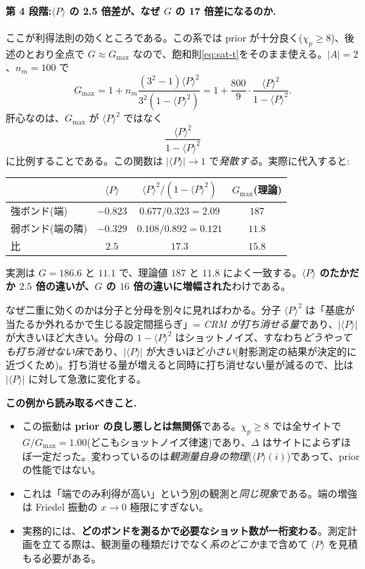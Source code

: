 \documentclass[11pt,a4paper]{ltjsarticle}
\newcommand{\ev}[1]{\langle #1\rangle}
\begin{document}
\paragraph{第 4 段階:$\ev{P}$ の 2.5 倍差が、なぜ $G$ の 17 倍差になるのか.}
ここが利得法則の効くところである。この系では prior が十分良く($\chi_p\ge8$)、後述のとおり全点で $G\approx G_{\max}$ なので、飽和則\eqref{eq:sat-t}をそのまま使える。$|A|=2$、$n_m=100$ で
\begin{equation}
  G_{\max}=1+n_m\frac{(3^2-1)\ev{P}^2}{3^2(1-\ev{P}^2)}
        =1+\frac{800}{9}\cdot\frac{\ev{P}^2}{1-\ev{P}^2}.
\end{equation}
肝心なのは、$G_{\max}$ が $\ev{P}^2$ ではなく
\begin{equation}
  \frac{\ev{P}^2}{1-\ev{P}^2}
\end{equation}
に比例することである。この関数は $|\ev{P}|\to1$ で\emph{発散する}。実際に代入すると:
\begin{center}\small
\begin{tabular}{lccc}
\hline
 & $\ev{P}$ & $\ev{P}^2/(1-\ev{P}^2)$ & $G_{\max}$(理論)\\
\hline
強ボンド(端)& $-0.823$ & $0.677/0.323=2.09$ & $187$\\
弱ボンド(端の隣)& $-0.329$ & $0.108/0.892=0.121$ & $11.8$\\
\hline
比 & $2.5$ & $\mathbf{17.3}$ & $\mathbf{15.8}$\\
\hline
\end{tabular}
\end{center}
実測は $G=186.6$ と $11.1$ で、理論値 $187$ と $11.8$ によく一致する。\textbf{$\ev{P}$ のたかだか $2.5$ 倍の違いが、$G$ の $16$ 倍の違いに増幅された}わけである。

なぜ二重に効くのかは分子と分母を別々に見ればわかる。分子 $\ev{P}^2$ は「基底が当たるか外れるかで生じる設定間揺らぎ」= \emph{CRM が打ち消せる量}であり、$|\ev{P}|$ が大きいほど大きい。分母の $1-\ev{P}^2$ はショットノイズ、すなわち\emph{どうやっても打ち消せない床}であり、$|\ev{P}|$ が大きいほど\emph{小さい}(射影測定の結果が決定的に近づくため)。打ち消せる量が増えると同時に打ち消せない量が減るので、比は $|\ev{P}|$ に対して急激に変化する。

\begin{keybox}
\textbf{この例から読み取るべきこと.}
\begin{itemize}
  \item この振動は \textbf{prior の良し悪しとは無関係}である。$\chi_p\ge8$ では全サイトで $G/G_{\max}=1.00$(どこもショットノイズ律速)であり、$\Delta$ はサイトによらずほぼ一定だった。変わっているのは\emph{観測量自身の物理}($\ev{P}(i)$)であって、prior の性能ではない。
  \item これは「端でのみ利得が高い」という別の観測と\emph{同じ現象}である。端の増強は Friedel 振動の $x\to0$ 極限にすぎない。
  \item 実務的には、\textbf{どのボンドを測るかで必要なショット数が一桁変わる}。測定計画を立てる際は、観測量の種類だけでなく\emph{系のどこか}まで含めて $\ev{P}$ を見積もる必要がある。
\end{itemize}
\end{keybox}
\end{document}
